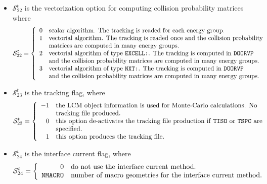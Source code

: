 \begin{itemize}
\item $\mathcal{S}^{t}_{22}$ is the vectorization option for computing collision probability matrices where
\begin{displaymath}
\mathcal{S}^{t}_{22} = \left\{
\begin{array}{rl}
 0 & \textrm{scalar algorithm. The tracking is readed for each energy group.} \\
 1 & \textrm{vectorial algorithm. The tracking is readed once and the collision
 probability} \\
   & \textrm{matrices are computed in many energy groups.} \\
 2 & \textrm{vectorial algorithm of type \moc{EXCELL:}. The tracking is computed in \moc{DOORVP}} \\
   & \textrm{and the collision probability matrices are computed in many energy groups.} \\
 3 & \textrm{vectorial algorithm of type \moc{NXT:}. The tracking is computed in \moc{DOORVP}} \\
   & \textrm{and the collision probability matrices are computed in many energy groups.} \\
\end{array} \right.
\end{displaymath}

\item $\mathcal{S}^{t}_{23}$ is the tracking flag, where
\begin{displaymath}
\mathcal{S}^{t}_{23} = \left\{
\begin{array}{rl}
 -1 & \textrm{the LCM object information is used for Monte-Carlo calculations. No} \\
   & \textrm{tracking file produced.} \\
 0 & \textrm{this option de-activates the tracking file production if \moc{TISO} or \moc{TSPC} are} \\
   & \textrm{specified.} \\
 1 & \textrm{this option produces the tracking file.} \\
\end{array} \right.
\end{displaymath}

\item $\mathcal{S}^{t}_{24}$ is the interface current flag, where
\begin{displaymath}
\mathcal{S}^{t}_{24} = \left\{
\begin{array}{rl}
 0 & \textrm{do not use the interface current method.} \\
 {\tt NMACRO} & \textrm{number of macro geometries for the interface current method.} \\
\end{array} \right.
\end{displaymath}


\end{itemize}
